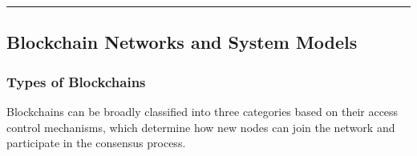 \begin{center}\rule{0.5\linewidth}{0.5pt}\end{center}

\subsection{Blockchain Networks and System
	Models}\label{section-1-blockchain-networks-and-system-models}

\subsubsection{Types of Blockchains}\label{types-of-blockchains}

Blockchains can be broadly classified into three categories based on
their access control mechanisms, which determine how new nodes can join
the network and participate in the consensus process.

